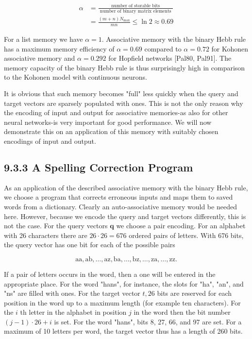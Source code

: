 \documentclass[10pt]{article}
\begin{document}
\begin{align*}
\alpha & =\frac{\text { number of storable bits }}{\text { number of binary matrix elements }}  \tag{9.11}\\
& =\frac{(m+n) N_{\max }}{m n} \leq \ln 2 \approx 0.69
\end{align*}


For a list memory we have $\alpha=1$. Associative memory with the binary Hebb rule has a maximum memory efficiency of $\alpha=0.69$ compared to $\alpha=0.72$ for Kohonen associative memory and $\alpha=0.292$ for Hopfield networks [Pal80, Pal91]. The memory capacity of the binary Hebb rule is thus surprisingly high in comparison to the Kohonen model with continuous neurons.

It is obvious that such memory becomes "full" less quickly when the query and target vectors are sparsely populated with ones. This is not the only reason why the encoding of input and output for associative memories-as also for other neural networks-is very important for good performance. We will now demonstrate this on an application of this memory with suitably chosen encodings of input and output.

\subsection*{9.3.3 A Spelling Correction Program}
As an application of the described associative memory with the binary Hebb rule, we choose a program that corrects erroneous inputs and maps them to saved words from a dictionary. Clearly an auto-associative memory would be needed here. However, because we encode the query and target vectors differently, this is not the case. For the query vectors $\boldsymbol{q}$ we choose a pair encoding. For an alphabet with 26 characters there are $26 \cdot 26=676$ ordered pairs of letters. With 676 bits, the query vector has one bit for each of the possible pairs

$$
\mathrm{aa}, \mathrm{ab}, \ldots, \mathrm{az}, \mathrm{ba}, \ldots, \mathrm{bz}, \ldots, \mathrm{za}, \ldots, \mathrm{zz} .
$$

If a pair of letters occurs in the word, then a one will be entered in the appropriate place. For the word "hans", for instance, the slots for "ha", "an", and "ns" are filled with ones. For the target vector $t, 26$ bits are reserved for each position in the word up to a maximum length (for example ten characters). For the $i$ th letter in the alphabet in position $j$ in the word then the bit number $(j-1) \cdot 26+i$ is set. For the word "hans", bits 8, 27, 66, and 97 are set. For a maximum of 10 letters per word, the target vector thus has a length of 260 bits.
\end{document}
